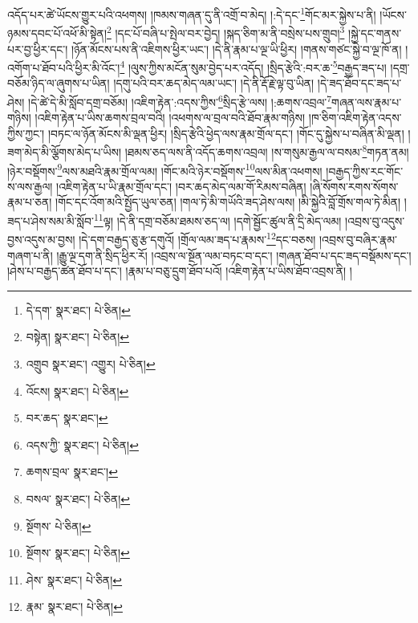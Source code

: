 འདོད་པར་ཚེ་ཡོངས་གྱུར་པའི་འཕགས། །ཁམས་གཞན་དུ་ནི་འགྲོ་བ་མེད། །:དེ་དང་\footnote{དེ་དག་  སྣར་ཐང་།  པེ་ཅིན། }གོང་མར་སྐྱེས་པ་ནི། །ཡོངས་ཉམས་དབང་པོ་འཕོ་མི་སྟེན།\footnote{བསྟེན།  སྣར་ཐང་།  པེ་ཅིན། } །དང་པོ་བཞི་པ་སྤེལ་བར་བྱེད། །སྐད་ཅིག་མ་ནི་བསྲེས་པས་གྲུབ།\footnote{འགྲུབ  སྣར་ཐང་། འགྱུར།  པེ་ཅིན། } །སྐྱེ་དང་གནས་པར་བྱ་ཕྱིར་དང་། །ཉོན་མོངས་པས་ནི་འཇིགས་ཕྱིར་ཡང་། །དེ་ནི་རྣམ་པ་ལྔ་ཡི་ཕྱིར། །གནས་གཙང་སྐྱེ་བ་ལྔ་ཁོ་ན། །འགོག་པ་ཐོབ་པའི་ཕྱིར་མི་འོང་།\footnote{འོངས།  སྣར་ཐང་།  པེ་ཅིན། } །ལུས་ཀྱིས་མངོན་སུམ་བྱེད་པར་འདོད། །སྲིད་རྩེའི་:བར་ཆ་\footnote{བར་ཆད་  སྣར་ཐང་། }བརྒྱད་ཟད་པ། །དགྲ་བཅོམ་ཉིད་ལ་ཞུགས་པ་ཡིན། །དགུ་པའི་བར་ཆད་མེད་ལམ་ཡང་། །དེ་ནི་རྡོ་རྗེ་ལྟ་བུ་ཡིན། །དེ་ཟད་ཐོབ་དང་ཟད་པ་ཤེས། །དེ་ཚེ་དེ་མི་སློབ་དགྲ་བཅོམ། །འཇིག་རྟེན་:འདས་ཀྱིས་\footnote{འདས་ཀྱི་  སྣར་ཐང་།  པེ་ཅིན། }སྲིད་རྩེ་ལས། །:ཆགས་འབྲལ་\footnote{ཆགས་བྲལ་  སྣར་ཐང་། }གཞན་ལས་རྣམ་པ་གཉིས། །འཇིག་རྟེན་པ་ཡིས་ཆགས་བྲལ་བའི། །འཕགས་ལ་བྲལ་བའི་ཐོབ་རྣམ་གཉིས། །ཁ་ཅིག་འཇིག་རྟེན་འདས་ཀྱིས་ཀྱང་། །བཏང་ལ་ཉོན་མོངས་མི་ལྡན་ཕྱིར། །སྲིད་རྩེའི་ཕྱེད་ལས་རྣམ་གྲོལ་དང་། །གོང་དུ་སྐྱེས་པ་བཞིན་མི་ལྡན། །ཟག་མེད་མི་ལྕོགས་མེད་པ་ཡིས། །ཐམས་ཅད་ལས་ནི་འདོད་ཆགས་འབྲལ། །ས་གསུམ་རྒྱལ་ལ་བསམ་\footnote{བསལ་  སྣར་ཐང་།  པེ་ཅིན། }གཏན་ནམ། །ཉེར་བསྡོགས་\footnote{སྔོགས་  པེ་ཅིན། }ལས་མཐའི་རྣམ་གྲོལ་ལམ། །གོང་མའི་ཉེར་བསྡོགས་\footnote{སྔོགས་  སྣར་ཐང་།  པེ་ཅིན། }ལས་མིན་འཕགས། །བརྒྱད་ཀྱིས་རང་གོང་ས་ལས་རྒྱལ། །འཇིག་རྟེན་པ་ཡི་རྣམ་གྲོལ་དང་། །བར་ཆད་མེད་ལམ་གོ་རིམས་བཞིན། །ཞི་སོགས་རགས་སོགས་རྣམ་པ་ཅན། །གོང་དང་འོག་མའི་སྤྱོད་ཡུལ་ཅན། །གལ་ཏེ་མི་གཡོའི་ཟད་ཤེས་ལས། །མི་སྐྱེའི་བློ་གྲོས་གལ་ཏེ་མིན། །ཟད་པ་ཤེས་སམ་མི་སློབ་\footnote{ཤེས་  སྣར་ཐང་།  པེ་ཅིན། }ལྟ། །དེ་ནི་དགྲ་བཅོམ་ཐམས་ཅད་ལ། །དགེ་སྦྱོང་ཚུལ་ནི་དྲི་མེད་ལམ། །འབྲས་བུ་འདུས་བྱས་འདུས་མ་བྱས། །དེ་དག་བརྒྱད་ཅུ་རྩ་དགུའོ། །གྲོལ་ལམ་ཟད་པ་རྣམས་\footnote{རྣམ་  སྣར་ཐང་།  པེ་ཅིན། }དང་བཅས། །འབྲས་བུ་བཞིར་རྣམ་གཞག་པ་ནི། །རྒྱུ་ལྔ་དག་ནི་སྲིད་ཕྱིར་རོ། །འབྲས་ལ་སྔོན་ལམ་བཏང་བ་དང་། །གཞན་ཐོབ་པ་དང་ཟད་བསྡོམས་དང་། །ཤེས་པ་བརྒྱད་ཚན་ཐོབ་པ་དང་། །རྣམ་པ་བཅུ་དྲུག་ཐོབ་པའོ། །འཇིག་རྟེན་པ་ཡིས་ཐོབ་འབྲས་ནི། །
